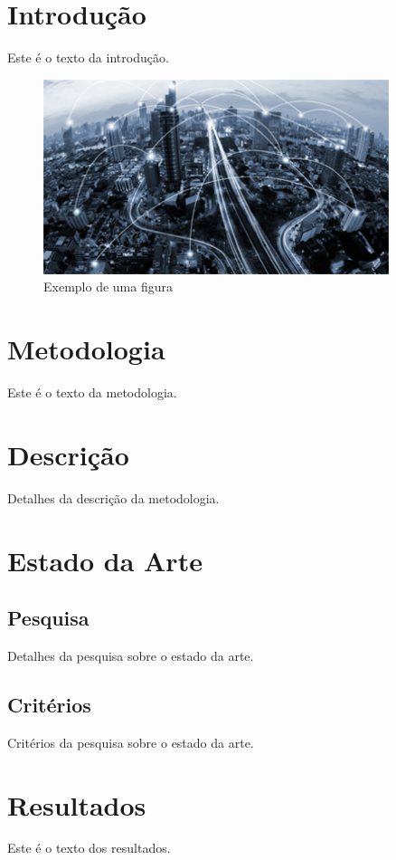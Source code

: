\documentclass[12pt,a4paper,final]{article}
\begin{document}
\section{Introdução}
Este é o texto da introdução. 

\begin{figure}[h!]
    \centering
    \includegraphics[width=0.9\textwidth]{img_meitw}
    \caption{Exemplo de uma figura}
    \label{fig:exemplo}
\end{figure}

\section{Metodologia}
Este é o texto da metodologia.

\section{Descrição}
Detalhes da descrição da metodologia.

\section{Estado da Arte}
\subsection{Pesquisa}
Detalhes da pesquisa sobre o estado da arte.

\subsection{Critérios}
Critérios da pesquisa sobre o estado da arte.

\section{Resultados}
Este é o texto dos resultados.
\end{document}
